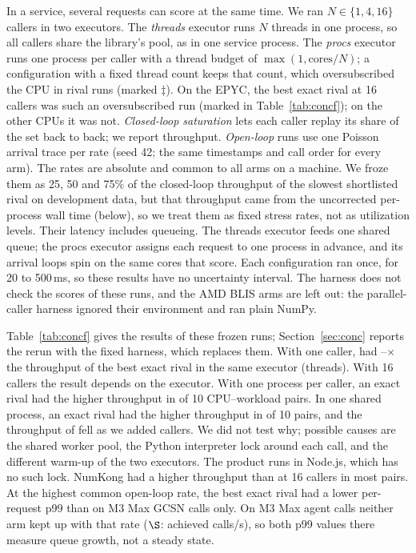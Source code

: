 In a service, several requests can score at the same time.
We ran $N \in \{1, 4, 16\}$ callers in two executors.
The \emph{threads} executor runs $N$ threads in one process, so all callers share the library's pool, as in one service process.
The \emph{procs} executor runs one process per caller with a thread budget of $\max(1, \text{cores}/N)$; a configuration with a fixed thread count keeps that count, which oversubscribed the CPU in  rival runs (marked $\ddagger$).
On the EPYC, the best exact rival at 16 callers was such an oversubscribed run (marked in Table~\ref{tab:concf}); on the other CPUs it was not.
\emph{Closed-loop saturation} lets each caller replay its share of the set back to back; we report throughput.
\emph{Open-loop} runs use one Poisson arrival trace per rate (seed 42; the same timestamps and call order for every arm).
The rates are absolute and common to all arms on a machine.
We froze them as 25, 50 and 75\% of the closed-loop throughput of the slowest shortlisted rival on development data, but that throughput came from the uncorrected per-process wall time (below), so we treat them as fixed stress rates, not as utilization levels.
Their latency includes queueing.
The threads executor feeds one shared queue; the procs executor assigns each request to one process in advance, and its arrival loops spin on the same cores that score.
Each configuration ran once, for 20 to 500\,ms, so these results have no uncertainty interval.
The harness does not check the scores of these runs, and the AMD BLIS arms are left out: the parallel-caller harness ignored their environment and ran plain NumPy.

Table~\ref{tab:concf} gives the results of these frozen runs; Section~\ref{sec:conc} reports the rerun with the fixed harness, which replaces them.
With one caller, \sweet had --$\times$ the throughput of the best exact rival in the same executor (threads).
With 16 callers the result depends on the executor.
With one process per caller, an exact rival had the higher throughput in  of 10 CPU--workload pairs.
In one shared process, an exact rival had the higher throughput in  of 10 pairs, and the throughput of \sweet fell as we added callers.
We did not test why; possible causes are the shared worker pool, the Python interpreter lock around each call, and the different warm-up of the two executors. The product runs in Node.js, which has no such lock.
NumKong had a higher throughput than \sweet at 16 callers in most pairs.
At the highest common open-loop rate, the best exact rival had a lower per-request p99 than \sweet on M3 Max GCSN calls only.
On M3 Max agent calls neither arm kept up with that rate ($\S$: \sweet achieved  calls/s), so both p99 values there measure queue growth, not a steady state.

